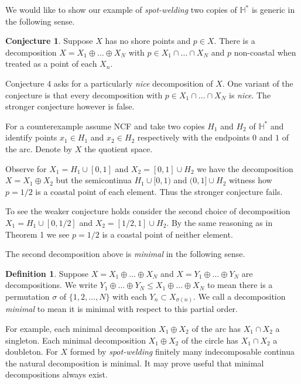\documentclass[12pt]{article}
\theoremstyle{plain}
\theoremstyle{definition}
\newtheorem{definition}[theorem]{Definition}
\newcounter{dummy}
\newcounter{dummy4}
\newcounter{dummy3}
\newtheorem{cnj3}[dummy3]{Conjecture}
\newcounter{dummy5}
\newcounter{dummy6}
\newcommand{\HH}{\ensuremath{\mathbb H}}
\newcommand{\0}{\ensuremath{\varnothing}}
\begin{document}
We would like to show our example of \textit{spot-welding} two copies of $\HH^*$ is generic in the following sense.

\begin{cnj3}
Suppose $X$ has no shore points and $p \in X$.
There is a decomposition $X = X_1  \oplus \ldots \oplus X_N$ with $p \in X_1 \cap \ldots \cap X_N$
and $p$ non-coastal when treated as a point of each $X_n$.
\end{cnj3}

Conjecture 4 asks for a particularly \textit{nice} decomposition of $X$. One variant of the conjecture is that every decomposition with $p \in X_1 \cap \ldots \cap X_N$ is \textit{nice}. The stronger conjecture however is false.

For a counterexample assume NCF and take two copies $H_1$ and $H_2$ of $\HH^*$ and 
identify points $x_1 \in H_1$ and $x_2 \in H_2$ respectively
with the endpoints $0$ and $1$ of the arc.
Denote by $X$ the quotient space.

Observe for $X_1 = H_1 \cup [0,1]$ and $X_2 = [0,1] \cup H_2$ we have the decomposition $X = X_1 \oplus X_2$ but the semicontinua $H_1 \cup [0, 1)$ and $ (0, 1] \cup H_2$
witness how $p = 1/2$ is a coastal point of each element.
Thus the stronger conjecture fails.

To see the weaker conjecture holds consider the second choice of decomposition 
$X_1 = H_1 \cup [0,1/2]$ and $X_2 = [1/2,1] \cup H_2$. By the same reasoning as in Theorem 1 we see $p=1/2$ is a coastal point of neither element.

The second decomposition above is \textit{minimal} in the following sense.

\begin{definition}
Suppose $X = X_1  \oplus \ldots \oplus X_N$ and $X = Y_1  \oplus \ldots \oplus Y_N$ are decompositions. We write $Y_1  \oplus \ldots \oplus Y_N \le X_1  \oplus \ldots \oplus X_N$ to mean there is a permutation $\sigma$ 
of $\{1,2,\ldots, N\}$ with each  $Y_n \subset X_{\sigma(n)}$.
We call a decomposition \textit{minimal} to mean it is minimal with respect to this partial order.
\end{definition}

For example, each minimal decomposition $X_1 \oplus X_2$ of the arc has $X_1 \cap X_2$ a singleton.
Each minimal decomposition $X_1 \oplus X_2$ of the circle has $X_1 \cap X_2$ a doubleton.
For $X$ formed by \textit{spot-welding} finitely many indecomposable continua the natural decomposition is minimal.
It may prove useful that minimal decompositions always exist.
\end{document}
